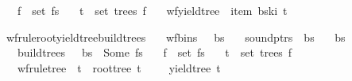 \begin{isabellebody}
\ \ \ {\isachardoublequoteopen}f\ {\isasymin}\ set\ fs{\isachardoublequoteclose}\isanewline
\ \ \ {\isachardoublequoteopen}t\ {\isasymin}\ set\ {\isacharparenleft}{\kern0pt}trees\ f{\isacharparenright}{\kern0pt}{\isachardoublequoteclose}\isanewline
\ \ \ {\isachardoublequoteopen}wf{\isacharunderscore}{\kern0pt}yield{\isacharunderscore}{\kern0pt}tree\ {\isasymomega}\ {\isacharparenleft}{\kern0pt}item\ {\isacharparenleft}{\kern0pt}bs{\isacharbang}{\kern0pt}k{\isacharbang}{\kern0pt}i{\isacharparenright}{\kern0pt}{\isacharparenright}{\kern0pt}\ t{\isachardoublequoteclose}%
\isadelimproof
%
\endisadelimproof
%
\isatagproof
%
\endisatagproof
{\isafoldproof}%
%
\isadelimproof
%
\endisadelimproof
%
\begin{isamarkuptext}%
%
\end{isamarkuptext}\isamarkuptrue%
\isamarkupfalse%
\ wf{\isacharunderscore}{\kern0pt}rule{\isacharunderscore}{\kern0pt}root{\isacharunderscore}{\kern0pt}yield{\isacharunderscore}{\kern0pt}tree{\isacharunderscore}{\kern0pt}build{\isacharunderscore}{\kern0pt}trees{\isacharcolon}{\kern0pt}\isanewline
\ \ \ {\isachardoublequoteopen}wf{\isacharunderscore}{\kern0pt}bins\ {\isasymG}\ {\isasymomega}\ bs{\isachardoublequoteclose}\isanewline
\ \ \ {\isachardoublequoteopen}sound{\isacharunderscore}{\kern0pt}ptrs\ {\isasymomega}\ bs{\isachardoublequoteclose}\isanewline
\ \ \ {\isachardoublequoteopen}{\isacharbar}{\kern0pt}bs{\isacharbar}{\kern0pt}\ {\isacharequal}{\kern0pt}\ {\isacharbar}{\kern0pt}{\isasymomega}{\isacharbar}{\kern0pt}\ {\isacharplus}{\kern0pt}\ {}{\isachardoublequoteclose}\isanewline
\ \ \ {\isachardoublequoteopen}build{\isacharunderscore}{\kern0pt}trees\ {\isasymG}\ {\isasymomega}\ bs\ {\isacharequal}{\kern0pt}\ Some\ fs{\isachardoublequoteclose}\isanewline
\ \ \ {\isachardoublequoteopen}f\ {\isasymin}\ set\ fs{\isachardoublequoteclose}\isanewline
\ \ \ {\isachardoublequoteopen}t\ {\isasymin}\ set\ {\isacharparenleft}{\kern0pt}trees\ f{\isacharparenright}{\kern0pt}{\isachardoublequoteclose}\isanewline
\ \ \ {\isachardoublequoteopen}wf{\isacharunderscore}{\kern0pt}rule{\isacharunderscore}{\kern0pt}tree\ {\isasymG}\ t\ {\isasymand}\ root{\isacharunderscore}{\kern0pt}tree\ t\ {\isacharequal}{\kern0pt}\ {\isasymSS}\ {\isasymG}\ {\isasymand}\ yield{\isacharunderscore}{\kern0pt}tree\ t\ {\isacharequal}{\kern0pt}\ {\isasymomega}{\isachardoublequoteclose}%

\end{isabellebody}
